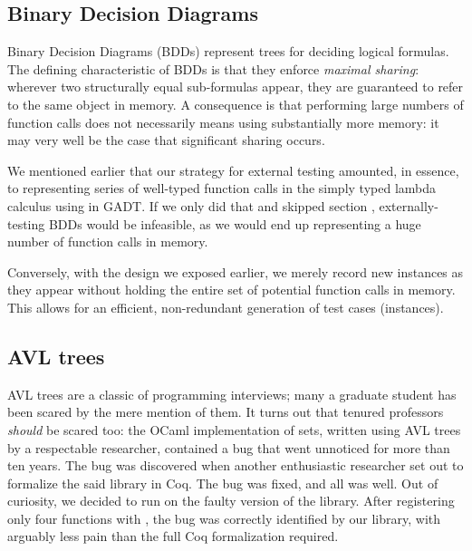 \subsection{Binary Decision Diagrams}

Binary Decision Diagrams (BDDs) represent trees for deciding logical formulas. The
defining characteristic of BDDs is that they enforce \emph{maximal sharing}:
wherever two structurally equal sub-formulas appear, they are guaranteed to
refer to the same object in memory. A consequence is that performing large
numbers of function calls does not necessarily means using substantially more
memory: it may very well be the case that significant sharing occurs.

We mentioned earlier that our strategy for external testing amounted, in
essence, to representing series of well-typed function calls in the simply typed
lambda calculus using in GADT. If we only did that and skipped section
, externally-testing BDDs would be infeasible, as we
would end up representing a huge number of function calls in memory.

Conversely, with the design we exposed earlier, we merely record new instances
as they appear without holding the entire set of potential function calls in
memory. This allows for an efficient, non-redundant generation of test cases
(instances).

\subsection{AVL trees}

AVL trees are a classic of programming interviews; many a graduate
student has been scared by the mere mention of them. It turns out that
tenured professors \emph{should} be scared too: the OCaml
implementation of sets, written using AVL trees by a respectable
researcher, contained a bug that went unnoticed for more than ten
years. The bug was discovered when another enthusiastic researcher
set out to formalize the said library in Coq. The bug was fixed, and
all was well. Out of curiosity, we decided to run \arti on the faulty
version of the library.  After registering only four functions with
\arti, the bug was correctly identified by our library, with arguably
less pain than the full Coq formalization required.
